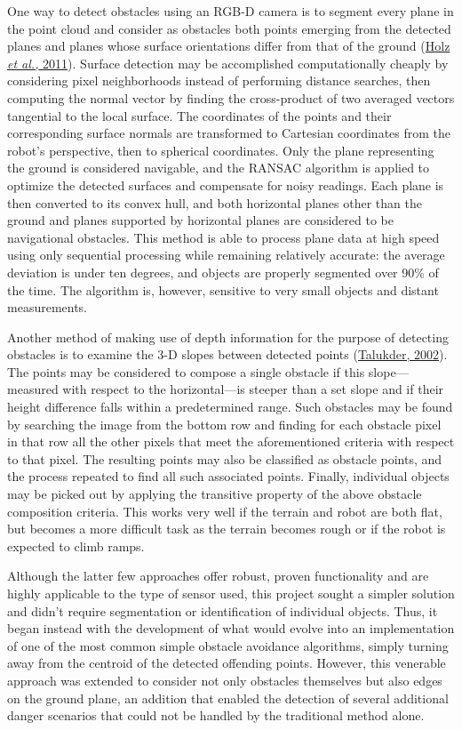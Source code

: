 \documentclass[12pt]{report}
\begin{document}
One way to detect obstacles using an RGB-D camera is to segment every plane in the point cloud and consider as obstacles both points emerging from the detected planes and planes whose surface orientations differ from that of the ground (\hyperref[bib:holz]{Holz \textit{et al.,} 2011}).  Surface detection may be accomplished computationally cheaply by considering pixel neighborhoods instead of performing distance searches, then computing the normal vector by finding the cross-product of two averaged vectors tangential to the local surface.  The coordinates of the points and their corresponding surface normals are transformed to Cartesian coordinates from the robot's perspective, then to spherical coordinates.  Only the plane representing the ground is considered navigable, and the RANSAC algorithm is applied to optimize the detected surfaces and compensate for noisy readings.  Each plane is then converted to its convex hull, and both horizontal planes other than the ground and planes supported by horizontal planes are considered to be navigational obstacles.  This method is able to process plane data at high speed using only sequential processing while remaining relatively accurate: the average deviation is under ten degrees, and objects are properly segmented over 90\% of the time.  The algorithm is, however, sensitive to very small objects and distant measurements.

Another method of making use of depth information for the purpose of detecting obstacles is to examine the 3-D slopes between detected points (\hyperref[bib:talukder]{Talukder, 2002}).  The points may be considered to compose a single obstacle if this slope---measured with respect to the horizontal---is steeper than a set slope and if their height difference falls within a predetermined range.  Such obstacles may be found by searching the image from the bottom row and finding for each obstacle pixel in that row all the other pixels that meet the aforementioned criteria with respect to that pixel.  The resulting points may also be classified as obstacle points, and the process repeated to find all such associated points.  Finally, individual objects may be picked out by applying the transitive property of the above obstacle composition criteria.  This works very well if the terrain and robot are both flat, but becomes a more difficult task as the terrain becomes rough or if the robot is expected to climb ramps.

Although the latter few approaches offer robust, proven functionality and are highly applicable to the type of sensor used, this project sought a simpler solution and didn't require segmentation or identification of individual objects.  Thus, it began instead with the development of what would evolve into an implementation of one of the most common simple obstacle avoidance algorithms, simply turning away from the centroid of the detected offending points.  However, this venerable approach was extended to consider not only obstacles themselves but also edges on the ground plane, an addition that enabled the detection of several additional danger scenarios that could not be handled by the traditional method alone.
\end{document}
